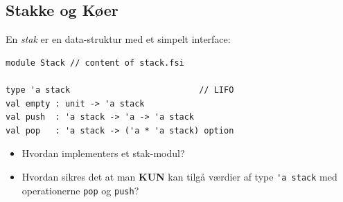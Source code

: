 \documentclass[rgb]{beamer}
\begin{document}
\subsection{Stakke og Køer}
\begin{frame}[fragile]
\begin{footnotesize}


  \vspace{1ex}

\begin{minipage}[b]{0.80\textwidth}

  En \emph{stak} er en data-struktur med et simpelt interface:

  \vspace{1ex}

\begin{lstlisting}[numbers=none,frame=none,mathescape]
module Stack // content of stack.fsi

type 'a stack                          // LIFO
val empty : unit -> 'a stack
val push  : 'a stack -> 'a -> 'a stack
val pop   : 'a stack -> ('a * 'a stack) option
\end{lstlisting}
  \vspace{1ex}
\begin{itemize}
\item Hvordan implementers et stak-modul?
\item Hvordan sikres det at man \textbf{KUN} kan tilgå værdier af type
  \lstinline{'a stack} med operationerne \lstinline{pop} og
  \lstinline{push}?
\end{itemize}

\end{minipage} \hspace{-8mm}
\begin{minipage}[b]{0.16\textwidth}


\end{minipage}
\end{footnotesize}
\end{frame}
\end{document}

